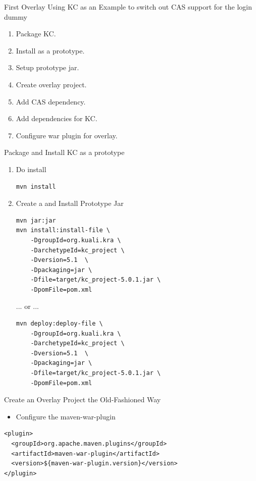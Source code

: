 \documentclass[xcolor=dvipsnames,14pt,professionalfonts]{beamer}
\begin{document}
\begin{frame}{First Overlay}
  Using KC as an Example to switch out CAS support for the login dummy
  \begin{enumerate}
    \item Package KC.
    \item Install as a prototype.
    \item Setup prototype jar.
    \item Create overlay project.
    \item Add CAS dependency.
    \item Add dependencies for KC.
    \item Configure war plugin for overlay.
  \end{enumerate}
\end{frame}

\begin{frame}[fragile]{Package and Install KC as a prototype}
  \begin{enumerate}
  \item Do install
  \begin{verbatim}
mvn install
  \end{verbatim}
  \item Create a and Install Prototype Jar
  \begin{verbatim}
mvn jar:jar
mvn install:install-file \
    -DgroupId=org.kuali.kra \
    -DarchetypeId=kc_project \ 
    -Dversion=5.1  \
    -Dpackaging=jar \
    -Dfile=target/kc_project-5.0.1.jar \
    -DpomFile=pom.xml
  \end{verbatim}
  ... or ...
  \begin{verbatim}
mvn deploy:deploy-file \
    -DgroupId=org.kuali.kra \
    -DarchetypeId=kc_project \ 
    -Dversion=5.1  \
    -Dpackaging=jar \
    -Dfile=target/kc_project-5.0.1.jar \
    -DpomFile=pom.xml
  \end{verbatim}
\end{enumerate}
\end{frame}

\begin{frame}[fragile]{Create an Overlay Project the Old-Fashioned
    Way}
  \begin{itemize}
  \item Configure the maven-war-plugin
  \end{itemize}
  \begin{verbatim}
<plugin>
  <groupId>org.apache.maven.plugins</groupId>
  <artifactId>maven-war-plugin</artifactId>
  <version>${maven-war-plugin.version}</version>
</plugin>
\end{verbatim}
\end{frame}
\end{document}
